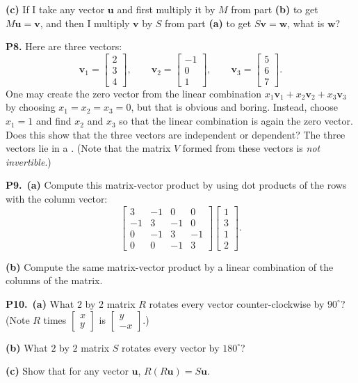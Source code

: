 \documentclass[12pt]{amsart}
\newcommand{\bu}{\bm{u}}
\newcommand{\bv}{\bm{v}}
\newcommand{\bw}{\bm{w}}
\newcommand{\prob}[1]{\bigskip\noindent\textbf{#1}\quad }
\newcommand{\epart}[1]{\medskip\noindent\textbf{(#1)}\quad }
\newcommand{\ppart}[1]{\,\textbf{(#1)}\quad }
\begin{document}
\epart{c} If I take any vector $\bu$ and first multiply it by $M$ from part \textbf{(b)} to get $M\bu=\bv$, and then I multiply $\bv$ by $S$ from part \textbf{(a)} to get $S\bv=\bw$, what is $\bw$?

\prob{P8.}  Here are three vectors:
    $$\bv_1 = \begin{bmatrix} 2 \\ 3 \\ 4 \end{bmatrix}, \qquad \bv_2 = \begin{bmatrix} -1 \\ 0 \\ 1 \end{bmatrix}, \qquad \bv_3 = \begin{bmatrix} 5 \\ 6 \\ 7 \end{bmatrix}.$$
One may create the zero vector from the linear combination $x_1 \bv_1 + x_2 \bv_2 + x_3 \bv_3$ by choosing $x_1=x_2=x_3=0$, but that is obvious and boring.  Instead, choose $x_1=1$ and find $x_2$ and $x_3$ so that the linear combination is again the zero vector.  Does this show that the three vectors are independent or dependent?  The three vectors lie in a \underline{\phantom{kdafjlas afds}}.  (Note that the matrix $V$ formed from these vectors is \emph{not invertible}.)

\prob{P9.}  \ppart{a} Compute this matrix-vector product by using dot products of the rows with the column vector:
    $$\begin{bmatrix} 3 & -1 & 0 & 0 \\ -1 & 3 & -1 & 0 \\ 0 & -1 & 3 & -1 \\ 0 & 0 & -1 & 3 \end{bmatrix} \begin{bmatrix} 1 \\ 3 \\ 1 \\ 2 \end{bmatrix}.$$

\epart{b}  Compute the same matrix-vector product by a linear combination of the columns of the matrix.

\prob{P10.}  \ppart{a} What $2$ by $2$ matrix $R$ rotates every vector counter-clockwise by $90^\circ$?  (Note $R$ times $\begin{bmatrix} x \\ y \end{bmatrix}$ is $\begin{bmatrix} y \\ -x \end{bmatrix}$.)

\epart{b} What $2$ by $2$ matrix $S$ rotates every vector by $180^\circ$?

\epart{c} Show that for any vector $\bu$, $R(R\bu) = S\bu$.
\end{document}
